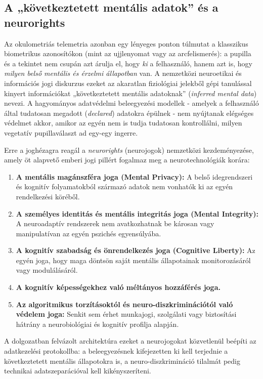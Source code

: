 \documentclass[12pt,a4paper,oneside]{book}
\begin{document}
\subsection{A „következtetett mentális adatok” és a neurorights}

Az okulometriás telemetria azonban egy lényeges ponton túlmutat a klasszikus biometrikus azonosítókon (mint az ujjlenyomat vagy az arcfelismerés): a pupilla és a tekintet nem csupán azt árulja el, hogy \emph{ki} a felhasználó, hanem azt is, hogy \emph{milyen belső mentális és érzelmi állapotban} van. A nemzetközi neuroetikai és információs jogi diskurzus ezeket az akaratlan fiziológiai jelekből gépi tanulással kinyert információkat „következtetett mentális adatoknak” (\emph{inferred mental data}) nevezi. A hagyományos adatvédelmi beleegyezési modellek - amelyek a felhasználó által tudatosan megadott (\emph{declared}) adatokra épülnek - nem nyújtanak elégséges védelmet akkor, amikor az egyén nem is tudja tudatosan kontrollálni, milyen vegetatív pupillaválaszt ad egy-egy ingerre.

Erre a joghézagra reagál a \emph{neurorights} (neurojogok) nemzetközi kezdeményezése, amely öt alapvető emberi jogi pillért fogalmaz meg a neurotechnológiák korára:
\begin{enumerate}
    \item \textbf{A mentális magánszféra joga (Mental Privacy):} A belső idegrendszeri és kognitív folyamatokból származó adatok nem vonhatók ki az egyén rendelkezési köréből.
    \item \textbf{A személyes identitás és mentális integritás joga (Mental Integrity):} A neuroadaptív rendszerek nem avatkozhatnak be károsan vagy manipulatívan az egyén pszichés egyensúlyába.
    \item \textbf{A kognitív szabadság és önrendelkezés joga (Cognitive Liberty):} Az egyén joga, hogy maga döntsön saját mentális állapotainak monitorozásáról vagy modulálásáról.
    \item \textbf{A kognitív képességekhez való méltányos hozzáférés joga.}
    \item \textbf{Az algoritmikus torzításoktól és neuro-diszkriminációtól való védelem joga:} Senkit sem érhet munkajogi, szolgálati vagy biztosítási hátrány a neurobiológiai és kognitív profilja alapján.
\end{enumerate}
A dolgozatban felvázolt architektúra ezeket a neurojogokat közvetlenül beépíti az adatkezelési protokollba: a beleegyezésnek kifejezetten ki kell terjednie a következtetett mentális állapotokra is, a neuro-diszkrimináció tilalmát pedig technikai adatszeparációval kell kikényszeríteni.
\end{document}
